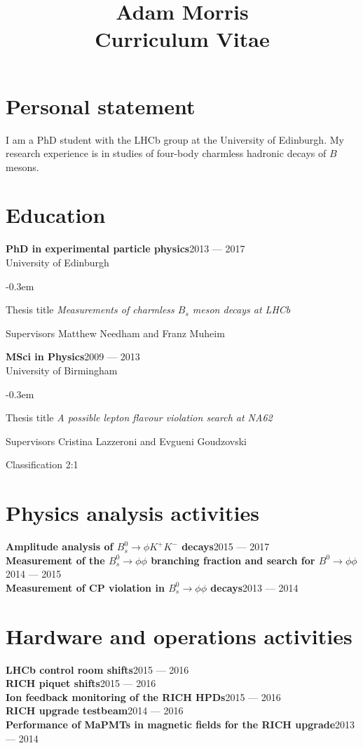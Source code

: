 \documentclass{simplecv}
\title{Adam Morris\\{\small Curriculum Vitae}}
\newcommand\dateditem[2]{#1\hfill#2\\}
\newcommand\topictitle[3]{\dateditem{{\bf{}#1}}{#3}#2}
\begin{document}
	\maketitle
	\section{Personal statement}
	I am a PhD student with the LHCb group at the University of Edinburgh.
	My research experience is in studies of four-body charmless hadronic decays of $B$ mesons.
	\section{Education}
	\topictitle{PhD in experimental particle physics}{University of Edinburgh}{2013 --- 2017}
	\begin{topic}
		\itemsep-0.3em
		\item[Thesis title]{\it Measurements of charmless $B_s$ meson decays at LHCb}
		\item[Supervisors]{Matthew Needham and Franz Muheim}
	\end{topic}
	\topictitle{MSci in Physics}{University of Birmingham}{2009 --- 2013}
	\begin{topic}
		\itemsep-0.3em
		\item[Thesis title]{\it A possible lepton flavour violation search at NA62}
		\item[Supervisors]{Cristina Lazzeroni and Evgueni Goudzovski}
		\item[Classification]{2:1}
	\end{topic}
	\section{Physics analysis activities}
	\topictitle{Amplitude analysis of $B^0_s \to \phi K^{+}K^{-}$ decays}{}{2015 --- 2017}
	\topictitle{Measurement of the $B^0_s \to \phi\phi$ branching fraction and search for $B^0 \to \phi \phi$}{}{2014 --- 2015}
	\topictitle{Measurement of CP violation in $B^0_s \to \phi\phi$ decays}{}{2013 --- 2014}
	\section{Hardware and operations activities}
	\topictitle{LHCb control room shifts}{}{2015 --- 2016}
	\topictitle{RICH piquet shifts}{}{2015 --- 2016}
	\topictitle{Ion feedback monitoring of the RICH HPDs}{}{2015 --- 2016}
	\topictitle{RICH upgrade testbeam}{}{2014 --- 2016}
	\topictitle{Performance of MaPMTs in magnetic fields for the RICH upgrade}{}{2013 --- 2014}
\end{document}
